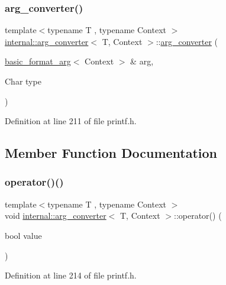 \subsubsection{\texorpdfstring{arg\+\_\+converter()}{arg\_converter()}}
{\footnotesize\ttfamily template$<$typename T , typename Context $>$ \\
\hyperlink{classinternal_1_1arg__converter}{internal\+::arg\+\_\+converter}$<$ T, Context $>$\+::\hyperlink{classinternal_1_1arg__converter}{arg\+\_\+converter} (\begin{DoxyParamCaption}\item[{\hyperlink{classbasic__format__arg}{basic\+\_\+format\+\_\+arg}$<$ Context $>$ \&}]{arg,  }\item[{Char}]{type }\end{DoxyParamCaption})\hspace{0.3cm}{\ttfamily [inline]}}



Definition at line 211 of file printf.\+h.



\subsection{Member Function Documentation}
\mbox{\label{classinternal_1_1arg__converter_aa1775af02483433ce44a1bccc58b1eb7}} 
\subsubsection{\texorpdfstring{operator()()}{operator()()}\hspace{0.1cm}{\footnotesize\ttfamily [1/3]}}
{\footnotesize\ttfamily template$<$typename T , typename Context $>$ \\
void \hyperlink{classinternal_1_1arg__converter}{internal\+::arg\+\_\+converter}$<$ T, Context $>$\+::operator() (\begin{DoxyParamCaption}\item[{bool}]{value }\end{DoxyParamCaption})\hspace{0.3cm}{\ttfamily [inline]}}



Definition at line 214 of file printf.\+h.

